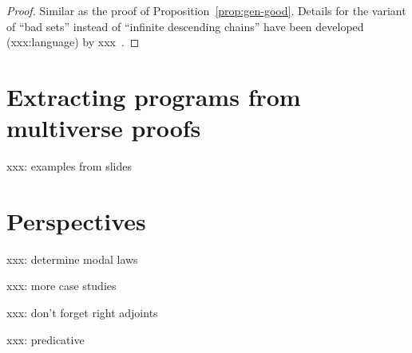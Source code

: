 \documentclass[oneside,reqno]{amsart}
\theoremstyle{definition}
\theoremstyle{plain}
\theoremstyle{remark}
\renewcommand{\_}{\mathpunct{.}\,}
\newcommand{\?}{\,{:}\,}
\begin{document}
\begin{proof}Similar as the proof of Proposition~\ref{prop:gen-good}. Details
for the variant of ``bad sets'' instead of ``infinite descending chains'' have
been developed (xxx:language) by xxx~\cite{xxx}.\end{proof}


\section{Extracting programs from multiverse proofs}
\label{sect:program-extraction}

xxx: examples from slides


\section{Perspectives}

xxx: determine modal laws

xxx: more case studies

xxx: don't forget right adjoints

xxx: predicative
\end{document}
